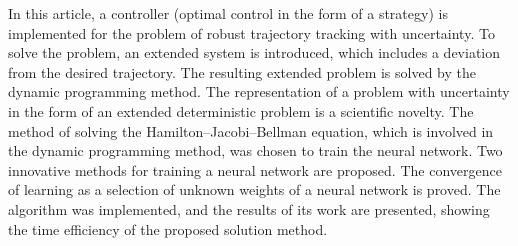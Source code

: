 \documentclass[14pt]{extarticle}
\begin{document}
In this article, a controller (optimal control in the form of a strategy) is implemented for the problem of robust trajectory tracking with uncertainty.
To solve the problem, an extended system is introduced, which includes a deviation from the desired trajectory.
The resulting extended problem is solved by the dynamic programming method.
The representation of a problem with uncertainty in the form of an extended deterministic problem is a scientific novelty.
The method of solving the Hamilton--Jacobi--Bellman equation, which is involved in the dynamic programming method, was chosen to train the neural network.
Two innovative methods for training a neural network are proposed.
The convergence of learning as a selection of unknown weights of a neural network is proved.
The algorithm was implemented, and the results of its work are presented, showing the time efficiency of the proposed solution method.
\end{document}
